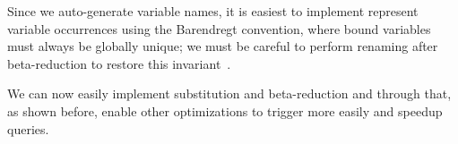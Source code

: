 
Since we auto-generate variable names, it is easiest to implement represent variable occurrences using the Barendregt convention, where bound variables must always be globally unique; we must be careful to perform renaming after beta-reduction to restore this invariant~\citep[Ch.~6]{Pierce02TAPL}.

We can now easily implement substitution and beta-reduction and through that, as shown before, enable other optimizations to trigger more easily and speedup queries.




